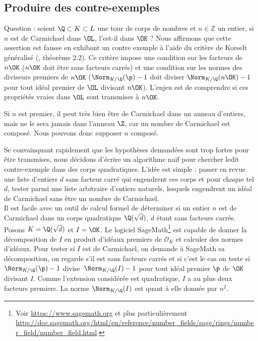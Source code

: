 \documentclass[a4paper, 12pt, oneside]{article}
\begin{document}
\newpage
\begin{appendix}
\section{Produire des contre-exemples}\label{annexe-ce}

Question : soient $\Q \subset K \subset L$ une tour de corps de nombres et $n\in \mathbb{Z}$ un entier, si $n$ est de Carmichael dans $\OL$, l'est-il dans $\OK$ ? Nous affirmons que cette assertion est fausse en exhibant un contre exemple à l'aide du critère de Korselt généralisé (\cite{article}, théorème 2.2). Ce critère impose une condition sur les facteurs de $n\OK$ ($n\OK$ doit être sans facteurs carrés) et une condition sur les normes des diviseurs premiers de $n\OK$ ($\Norm_{K/\Q}(\p)-1$ doit diviser $\Norm_{K/\Q}(n\OK) - 1$ pour tout idéal premier de $\OL$ divisant $n\OK$). L'enjeu est de comprendre si ces propriétés vraies dans $\OL$ sont transmises à $n\OK$.

\begin{remarque}Si $n$ est premier, il peut très bien être de Carmichael dans un anneau d'entiers, mais ne le sera jamais dans l'anneau $\Z$, car un nombre de Carmichael est composé. Nous pouvons donc supposer $n$ composé. \end{remarque}

Se convainquant rapidement que les hypothèses demandées sont trop fortes pour être transmises, nous décidons d'écrire un algorithme naïf pour chercher ledit contre-exemple dans des corps quadratiques. L'idée est simple : passer en revue une liste d'entiers $d$ sans facteur carré qui engendrent ces corps et pour chaque tel $d$, tester parmi une liste arbitraire d'entiers naturels, lesquels engendrent un idéal de Carmichael sans être un nombre de Carmichael. \\

Il est facile avec un outil de calcul formel de déterminer si un entier $n$ est de Carmichael dans un corps quadratique $\Q(\sqrt{d})$, $d$ étant sans facteurs carrés. Posons $K=\Q(\sqrt{d})$ et $I = \OK$. Le logiciel SageMath\footnote{Voir \url{https://www.sagemath.org} et plus particulièrement \url{http://doc.sagemath.org/html/en/reference/number_fields/sage/rings/number_field/number_field.html}.} est capable de donner la décomposition de $I$ en produit d'idéaux premiers de $\mathcal{O}_K$ et calculer des normes d'idéaux. Pour tester si $I$ est de Carmichael, on demande à SageMath sa décomposition, on regarde s'il est sans facteurs carrés et si c'est le cas on teste si $\Norm_{K/\Q}(\p) - 1$ divise $\Norm_{K/\Q}(I) - 1$ pour tout idéal premier $\p$ de $\OK$ divisant $I$. Comme l'extension considérée est quadratique, $I$ a au plus deux facteurs premiers. La norme $\Norm_{K/\Q}(I)$ est quant à elle donnée par $n^2$. \\


\end{appendix}
\end{document}
